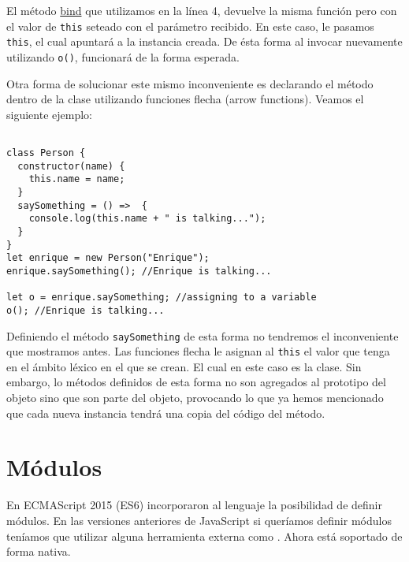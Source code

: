 \documentclass[a4paper, oneside, titlepage, 12pt]{paper}
\begin{document}
El método \href{https://developer.mozilla.org/es/docs/Web/JavaScript/Reference/Global_Objects/Function/bind}{bind} que utilizamos en la línea 4, devuelve la misma función pero con el valor de \texttt{this} seteado con el parámetro recibido. En este caso, le pasamos \texttt{this}, el cual apuntará a la instancia creada. De ésta forma al invocar nuevamente utilizando \texttt{o()}, funcionará de la forma esperada.
\newline

Otra forma de solucionar este mismo inconveniente es declarando el método dentro de la clase utilizando funciones flecha (arrow functions). Veamos el siguiente ejemplo:

\begin{verbatim}

class Person {
  constructor(name) {
    this.name = name;
  }
  saySomething = () =>  {
    console.log(this.name + " is talking...");
  }
}
let enrique = new Person("Enrique");
enrique.saySomething(); //Enrique is talking...

let o = enrique.saySomething; //assigning to a variable
o(); //Enrique is talking...
\end{verbatim}

Definiendo el método \texttt{saySomething} de esta forma no tendremos el inconveniente que mostramos antes. Las funciones flecha le asignan al \texttt{this} el valor que tenga en el ámbito léxico en el que se crean. El cual en este caso es la clase. Sin embargo, lo métodos definidos de esta forma no son agregados al prototipo del objeto sino que son parte del objeto, provocando lo que ya hemos mencionado que cada nueva instancia tendrá una copia del código del método.

\section{Módulos}

En ECMAScript 2015 (ES6) incorporaron al lenguaje la posibilidad de definir módulos. En las versiones anteriores de JavaScript si queríamos definir módulos teníamos que utilizar alguna herramienta externa como \cite{requirejs}. Ahora está soportado de forma nativa. 
\newline
\end{document}
